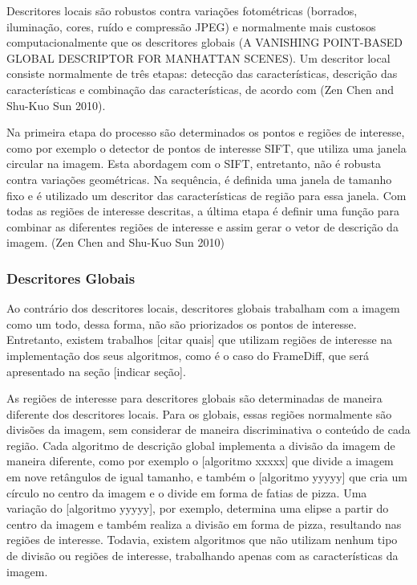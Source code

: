 Descritores locais são robustos contra variações fotométricas (borrados, iluminação, cores, ruído e compressão JPEG) e normalmente mais custosos computacionalmente que os descritores globais (A VANISHING POINT-BASED GLOBAL DESCRIPTOR FOR MANHATTAN SCENES). Um descritor local consiste normalmente de três etapas: detecção das características, descrição das características e combinação das características, de acordo com (Zen Chen and Shu-Kuo Sun 2010).

Na primeira etapa do processo são determinados os pontos e regiões de interesse, como por exemplo o detector de pontos de interesse SIFT, que utiliza uma janela circular na imagem. Esta abordagem com o SIFT, entretanto, não é robusta contra variações geométricas. Na sequência, é definida uma janela de tamanho fixo e é utilizado um descritor das características de região para essa janela. Com todas as regiões de interesse descritas, a última etapa é definir uma função para combinar as diferentes regiões de interesse e assim gerar o vetor de descrição da imagem. (Zen Chen and Shu-Kuo Sun 2010) 


\subsubsection{Descritores Globais}
\label{descritores globais}

Ao contrário dos descritores locais, descritores globais trabalham com a imagem como um todo, dessa forma, não são priorizados os pontos de interesse. Entretanto, existem trabalhos [citar quais] que utilizam regiões de interesse na implementação dos seus algoritmos, como é o caso do FrameDiff, que será apresentado na seção [indicar seção]. 

As regiões de interesse para descritores globais são determinadas de maneira diferente dos descritores locais. Para os globais, essas regiões normalmente são divisões da imagem, sem considerar de maneira discriminativa o conteúdo de cada região. Cada algoritmo de descrição global implementa a divisão da imagem de maneira diferente, como por exemplo o [algoritmo xxxxx] que divide a imagem em nove retângulos de igual tamanho, e também o [algoritmo yyyyy] que cria um círculo no centro da imagem e o divide em forma de fatias de pizza. Uma variação do [algoritmo yyyyy], por exemplo, determina uma elipse a partir do centro da imagem e também realiza a divisão em forma de pizza, resultando nas regiões de interesse. Todavia, existem algoritmos que não utilizam nenhum tipo de divisão ou regiões de interesse, trabalhando apenas com as características da imagem.

